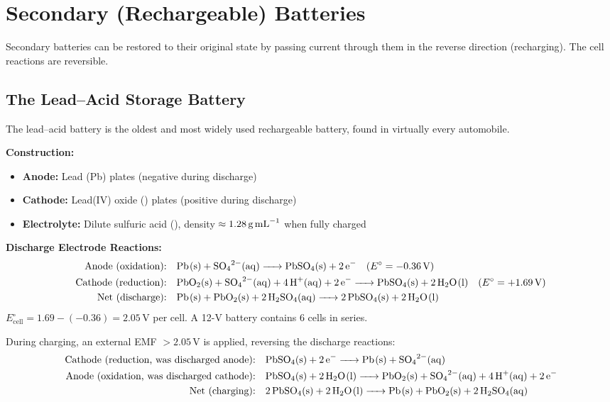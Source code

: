 \section{Secondary (Rechargeable) Batteries}

Secondary batteries can be restored to their original state by passing current through them in the reverse direction (recharging). The cell reactions are reversible.

\subsection{The Lead--Acid Storage Battery}

The lead--acid battery is the oldest and most widely used rechargeable battery, found in virtually every automobile.

\begin{conceptbox}
\textbf{Construction:}
\begin{itemize}
    \item \textbf{Anode:} Lead (Pb) plates (negative during discharge)
    \item \textbf{Cathode:} Lead(IV) oxide () plates (positive during discharge)
    \item \textbf{Electrolyte:} Dilute sulfuric acid (), density $\approx 1.28\,\text{g\,mL}^{-1}$ when fully charged
\end{itemize}

\textbf{Discharge Electrode Reactions:}
\begin{align*}
\text{Anode (oxidation):}& \quad \ce{Pb(s) + SO4^2-(aq) -> PbSO4(s) + 2e-} \quad (E^\circ = -0.36\,\text{V})\\
\text{Cathode (reduction):}& \quad \ce{PbO2(s) + SO4^2-(aq) + 4H+(aq) + 2e- -> PbSO4(s) + 2H2O(l)} \quad (E^\circ = +1.69\,\text{V})\\
\text{Net (discharge):}& \quad \ce{Pb(s) + PbO2(s) + 2H2SO4(aq) -> 2PbSO4(s) + 2H2O(l)}
\end{align*}
$E_{\text{cell}}^\circ = 1.69 - (-0.36) = 2.05\,\text{V}$ per cell. A 12-V battery contains 6 cells in series.
\end{conceptbox}

\begin{conceptbox}
During charging, an external EMF $> 2.05\,\text{V}$ is applied, reversing the discharge reactions:
\begin{align*}
\text{Cathode (reduction, was discharged anode):}& \quad \ce{PbSO4(s) + 2e- -> Pb(s) + SO4^2-(aq)}\\
\text{Anode (oxidation, was discharged cathode):}& \quad \ce{PbSO4(s) + 2H2O(l) -> PbO2(s) + SO4^2-(aq) + 4H+(aq) + 2e-}\\
\text{Net (charging):}& \quad \ce{2PbSO4(s) + 2H2O(l) -> Pb(s) + PbO2(s) + 2H2SO4(aq)}
\end{align*}
\end{conceptbox}

